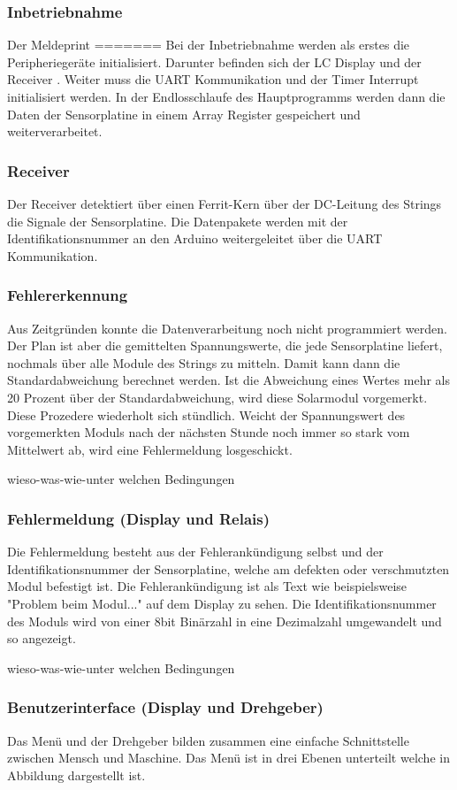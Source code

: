 \subsubsection{Inbetriebnahme}

Der Meldeprint
=======
Bei der Inbetriebnahme werden als erstes die Peripheriegeräte initialisiert. Darunter befinden sich der LC Display und der Receiver . Weiter muss die UART Kommunikation und der Timer Interrupt initialisiert werden. In der Endlosschlaufe des Hauptprogramms werden dann die Daten der Sensorplatine in einem Array Register gespeichert und weiterverarbeitet.

\subsubsection{Receiver}
Der Receiver detektiert über einen Ferrit-Kern über der DC-Leitung des Strings die Signale der Sensorplatine. Die Datenpakete werden mit der Identifikationsnummer an den Arduino weitergeleitet über die UART Kommunikation.
\subsubsection{Fehlererkennung}
Aus Zeitgründen konnte die Datenverarbeitung noch nicht programmiert werden. Der Plan ist aber die gemittelten Spannungswerte, die jede Sensorplatine liefert, nochmals über alle Module des Strings zu mitteln. Damit kann dann die Standardabweichung berechnet werden. Ist die Abweichung eines Wertes mehr als 20 Prozent über der Standardabweichung, wird diese Solarmodul vorgemerkt. Diese Prozedere wiederholt sich stündlich. Weicht der Spannungswert des vorgemerkten Moduls nach der nächsten Stunde noch immer so stark vom Mittelwert ab, wird eine Fehlermeldung losgeschickt.

wieso-was-wie-unter welchen Bedingungen
\subsubsection{Fehlermeldung (Display und Relais)}
Die Fehlermeldung besteht aus der Fehlerankündigung selbst und der Identifikationsnummer der Sensorplatine, welche am defekten oder verschmutzten Modul befestigt ist. Die Fehlerankündigung ist als Text wie beispielsweise "Problem beim Modul..." auf dem Display zu sehen. Die Identifikationsnummer des Moduls wird von einer 8bit Binärzahl in eine Dezimalzahl umgewandelt und so angezeigt.

wieso-was-wie-unter welchen Bedingungen
\subsubsection{Benutzerinterface (Display und Drehgeber)}

Das Menü und der Drehgeber bilden zusammen eine einfache Schnittstelle zwischen Mensch und Maschine. Das Menü ist in drei Ebenen unterteilt welche in Abbildung  dargestellt ist.


